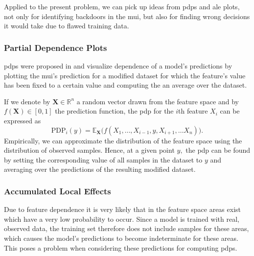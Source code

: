 \documentclass[10pt,sigconf,letterpaper,dvipsnames]{acmart}
\begin{document}
Applied to the present problem, we can pick up ideas from \glspl{pdp} and \gls{ale} plots, not only for identifying backdoors in the \gls{mui}, but also for finding wrong decisions it would take due to flawed training data.

\subsubsection{Partial Dependence Plots}
\glspl{pdp} were proposed in \cite{friedman_greedy_2001} and visualize dependence of a model's predictions by plotting the \gls{mui}'s prediction for a modified dataset for which the feature's value has been fixed to a certain value and computing the an average over the dataset.

If we denote by $\boldsymbol X \in \mathbb R ^n$ a random vector drawn from the feature space and by $f(\boldsymbol X) \in [0,1]$ the  prediction function, the \gls{pdp} for the $i$th feature $X_i$ can be expressed as
\begin{equation}
\text{PDP}_i(y) = \mathbb E_{\boldsymbol X}\Big(f(X_1,\ldots,X_{i-1},y,X_{i+1},\ldots X_n)\Big) . %
\end{equation}
Empirically, we can approximate the distribution of the feature space using the distribution of observed samples. Hence, at a given point $y,$ the \gls{pdp} can be found by setting the corresponding value of all samples in the dataset to $y$ and averaging over the predictions of the resulting modified dataset.

\subsubsection{Accumulated Local Effects}
Due to feature dependence it is very likely that in the feature space areas exist which have a very low probability to occur. Since a model is trained with real, observed data, the training set therefore does not include samples for these areas, which causes the model's predictions to become indeterminate for these areas. This poses a problem when considering these predictions for computing \glspl{pdp}.
\end{document}
